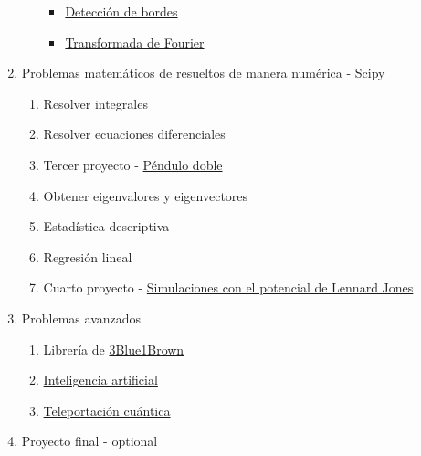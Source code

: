 \documentclass[12pt,letterpaper]{article}
\begin{document}
\begin{enumerate}
\begin{enumerate}
        \begin{itemize}
            \item \href{https://en.wikipedia.org/wiki/Edge_detection}{Detección de bordes}
            \item \href{http://www2.elo.utfsm.cl/~elo328/pdf1dpp/PDI09_Frecuencia_1dpp.pdf}{Transformada de Fourier}
        \end{itemize}
    \end{enumerate}
    \item Problemas matemáticos de resueltos de manera numérica - Scipy
    \begin{enumerate}
        \item Resolver integrales
        \item Resolver ecuaciones diferenciales
        \item Tercer proyecto - \href{https://en.wikipedia.org/wiki/Double_pendulum}{Péndulo doble}
        \item Obtener eigenvalores y eigenvectores
        \item Estadística descriptiva
        \item Regresión lineal
        \item Cuarto proyecto - \href{https://es.wikipedia.org/wiki/Potencial_de_Lennard-Jones}{Simulaciones con el potencial de Lennard Jones}
    \end{enumerate}
    \item Problemas avanzados
    \begin{enumerate}
        \item Librería de \href{https://www.youtube.com/channel/UCYO_jab_esuFRV4b17AJtAw}{3Blue1Brown}
        \item \href{https://es.wikipedia.org/wiki/Inteligencia_artificial}{Inteligencia artificial}
        \item \href{https://es.wikipedia.org/wiki/Teleportaci%C3%B3n_cu%C3%A1ntica}{Teleportación cuántica}
    \end{enumerate}
    \item Proyecto final - optional
\end{enumerate}
\end{document}
